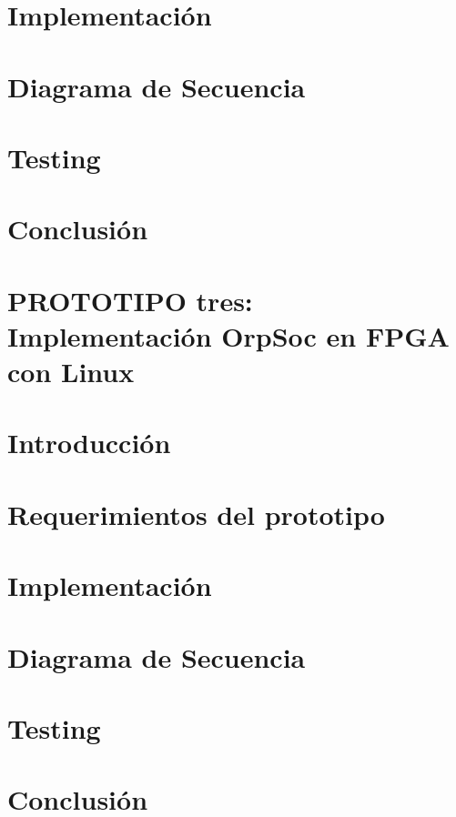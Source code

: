 		\section{Implementación}
		\section{Diagrama de Secuencia}
		\section{Testing}
		\section{Conclusión}
	\section{PROTOTIPO tres: Implementación OrpSoc en FPGA con Linux}
		\section{Introducción}
		\section{Requerimientos del prototipo}
		\section{Implementación}
		\section{Diagrama de Secuencia}
		\section{Testing}
		\section{Conclusión}

